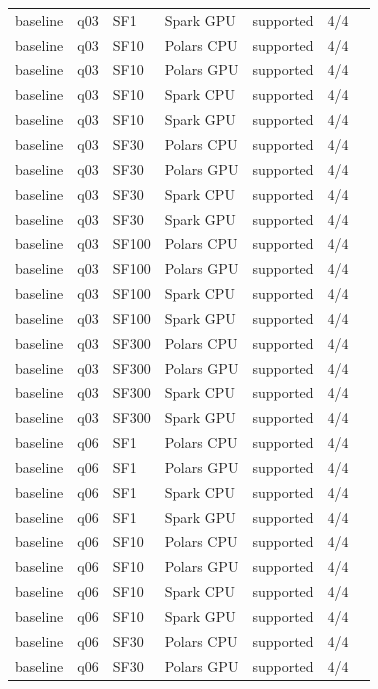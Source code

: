 \begin{longtable}{lllllll}
baseline & q03 & SF1 & Spark GPU & supported & 4/4 &  \\
baseline & q03 & SF10 & Polars CPU & supported & 4/4 &  \\
baseline & q03 & SF10 & Polars GPU & supported & 4/4 &  \\
baseline & q03 & SF10 & Spark CPU & supported & 4/4 &  \\
baseline & q03 & SF10 & Spark GPU & supported & 4/4 &  \\
baseline & q03 & SF30 & Polars CPU & supported & 4/4 &  \\
baseline & q03 & SF30 & Polars GPU & supported & 4/4 &  \\
baseline & q03 & SF30 & Spark CPU & supported & 4/4 &  \\
baseline & q03 & SF30 & Spark GPU & supported & 4/4 &  \\
baseline & q03 & SF100 & Polars CPU & supported & 4/4 &  \\
baseline & q03 & SF100 & Polars GPU & supported & 4/4 &  \\
baseline & q03 & SF100 & Spark CPU & supported & 4/4 &  \\
baseline & q03 & SF100 & Spark GPU & supported & 4/4 &  \\
baseline & q03 & SF300 & Polars CPU & supported & 4/4 &  \\
baseline & q03 & SF300 & Polars GPU & supported & 4/4 &  \\
baseline & q03 & SF300 & Spark CPU & supported & 4/4 &  \\
baseline & q03 & SF300 & Spark GPU & supported & 4/4 &  \\
baseline & q06 & SF1 & Polars CPU & supported & 4/4 &  \\
baseline & q06 & SF1 & Polars GPU & supported & 4/4 &  \\
baseline & q06 & SF1 & Spark CPU & supported & 4/4 &  \\
baseline & q06 & SF1 & Spark GPU & supported & 4/4 &  \\
baseline & q06 & SF10 & Polars CPU & supported & 4/4 &  \\
baseline & q06 & SF10 & Polars GPU & supported & 4/4 &  \\
baseline & q06 & SF10 & Spark CPU & supported & 4/4 &  \\
baseline & q06 & SF10 & Spark GPU & supported & 4/4 &  \\
baseline & q06 & SF30 & Polars CPU & supported & 4/4 &  \\
baseline & q06 & SF30 & Polars GPU & supported & 4/4 &  \\

\end{longtable}
